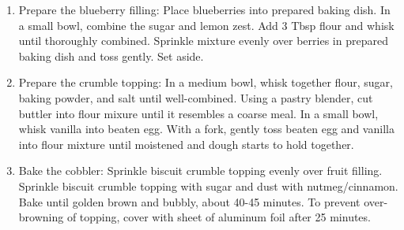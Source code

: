 \documentclass[11pt, twoside, openany]{book}
\begin{document}
\begin{minipage}[t]{\linewidth}
\begin{enumerate}
\item Prepare the blueberry filling: Place blueberries into prepared baking dish. In a small bowl, combine the sugar and lemon zest. Add 3 Tbsp flour and whisk until thoroughly combined. Sprinkle mixture evenly over berries in prepared baking dish and toss gently. Set aside.
\item Prepare the crumble topping: In a medium bowl, whisk together flour, sugar, baking powder, and salt until well-combined. Using a pastry blender, cut buttler into flour mixure until it resembles a coarse meal. In a small bowl, whisk vanilla into beaten egg. With a fork, gently toss beaten egg and vanilla into flour mixture until moistened and dough starts to hold together.
\item Bake the cobbler: Sprinkle biscuit crumble topping evenly over fruit filling. Sprinkle biscuit crumble topping with sugar and dust with nutmeg/cinnamon. Bake until golden brown and bubbly, about 40-45 minutes. To prevent over-browning of topping, cover with sheet of aluminum foil after 25 minutes.
\end{enumerate}
\end{minipage}\vspace{8mm}
\end{document}
